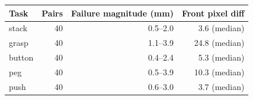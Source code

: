 \begin{tabular}{lrrr}
\toprule
Task & Pairs & Failure magnitude (mm) & Front pixel diff \\
\midrule
stack & 40 & 0.5--2.0 & 3.6 (median) \\
grasp & 40 & 1.1--3.9 & 24.8 (median) \\
button & 40 & 0.4--2.4 & 5.3 (median) \\
peg & 40 & 0.5--3.9 & 10.3 (median) \\
push & 40 & 0.6--3.0 & 3.7 (median) \\
\bottomrule
\end{tabular}